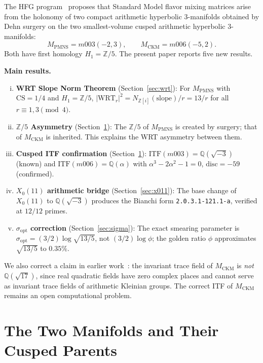 \documentclass[11pt,a4paper]{article}
\theoremstyle{definition}
\theoremstyle{remark}
\newcommand{\MPMNS}{M_{\mathrm{PMNS}}}
\newcommand{\MCKM}{M_{\mathrm{CKM}}}
\newcommand{\QQ}{\mathbb{Q}}
\newcommand{\Zfive}{\mathbb{Z}/5}
\newcommand{\Zi}{\mathbb{Z}[i]}
\newcommand{\CS}{\mathrm{CS}}
\newcommand{\WRT}{\mathrm{WRT}}
\newcommand{\ITF}{\mathrm{ITF}}
\begin{document}
The HFG program~\cite{Gentry:Unified} proposes that Standard Model
flavor mixing matrices arise from the holonomy of two compact arithmetic
hyperbolic 3-manifolds obtained by Dehn surgery on the two smallest-volume
cusped arithmetic hyperbolic 3-manifolds:
\begin{equation}
\MPMNS = m003(-2,3), \qquad \MCKM = m006(-5,2).
\end{equation}
Both have first homology $H_1 = \Zfive$.
The present paper reports five new results.

\textbf{Main results.}
\begin{enumerate}[(i)]
\item \textbf{WRT Slope Norm Theorem} (Section~\ref{sec:wrt}):
  For $\MPMNS$ with $\CS = 1/4$ and $H_1 = \Zfive$,
  $|\WRT_r|^2 = N_{\Zi}(\mathrm{slope})/r = 13/r$
  for all $r \equiv 1,3\pmod{4}$.

\item \textbf{$\mathbb{Z}/5$ Asymmetry} (Section~\ref{sec:parents}):
  The $\Zfive$ of $\MPMNS$ is created by surgery; that of $\MCKM$
  is inherited. This explains the WRT asymmetry between them.

\item \textbf{Cusped ITF confirmation} (Section~\ref{sec:parents}):
  $\ITF(m003) = \QQ(\sqrt{-3})$ (known) and $\ITF(m006) = \QQ(\alpha)$
  with $\alpha^3-2\alpha^2-1=0$, $\mathrm{disc} = -59$ (confirmed).

\item \textbf{$X_0(11)$ arithmetic bridge} (Section~\ref{sec:x011}):
  The base change of $X_0(11)$ to $\QQ(\sqrt{-3})$ produces the
  Bianchi form \texttt{2.0.3.1-121.1-a}, verified at $12/12$ primes.

\item \textbf{$\sigma_\mathrm{opt}$ correction} (Section~\ref{sec:sigma}):
  The exact smearing parameter is $\sigma_\mathrm{opt} = (3/2)\log\sqrt{13/5}$,
  not $(3/2)\log\phi$; the golden ratio $\phi$ approximates $\sqrt{13/5}$
  to $0.35\%$.
\end{enumerate}

We also correct a claim in earlier work~\cite{Gentry:X011}: the invariant
trace field of $\MCKM$ is \emph{not} $\QQ(\sqrt{17})$, since real quadratic
fields have zero complex places and cannot serve as invariant trace fields
of arithmetic Kleinian groups.
The correct ITF of $\MCKM$ remains an open computational problem.

\section{The Two Manifolds and Their Cusped Parents}
\label{sec:parents}
\end{document}
